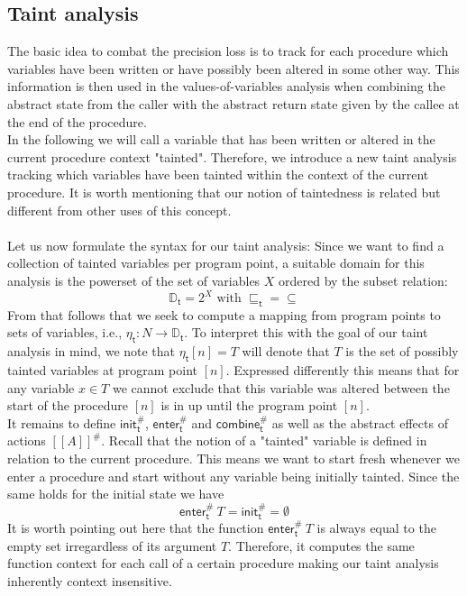    \subsection{Taint analysis}\label{section:formalTaint}
      The basic idea to combat the precision loss is to track for each procedure which variables have been written or have possibly been altered in some other way. This information is then used in the values-of-variables analysis when combining the abstract state from the caller with the abstract return state given by the callee at the end of the procedure.\\
      In the following we will call a variable that has been written or altered in the current procedure context "tainted". Therefore, we introduce a new taint analysis tracking which variables have been tainted within the context of the current procedure. It is worth mentioning that our notion of taintedness is related but different from other uses of this concept.\\
      \\
      Let us now formulate the syntax for our taint analysis:
      Since we want to find a collection of tainted variables per program point, a suitable domain for this analysis is the powerset of the set of variables $X$ ordered by the subset relation:
      \[\mathbb{D}_\textsf{t} = 2^X \text{ with } \sqsubseteq_\textsf{t} = \subseteq\]
      From that follows that we seek to compute a mapping from program points to sets of variables, i.e., $\eta_\textsf{t}: N \rightarrow \mathbb{D}_\textsf{t}$. To interpret this with the goal of our taint analysis in mind, we note that $\eta_\textsf{t} [n] = T$ will denote that $T$ is the set of possibly tainted variables at program point $[n]$. Expressed differently this means that for any variable $x \in T$ we cannot exclude that this variable was altered between the start of the procedure $[n]$ is in up until the program point $[n]$.\\
      It remains to define $\textsf{init}^{\#}_\textsf{t}$, $\textsf{enter}^{\#}_\textsf{t}$ and $\textsf{combine}^{\#}_\textsf{t}$ as well as the abstract effects of actions $[\![ A ]\!]^{\#}$. Recall that the notion of a "tainted" variable is defined in relation to the current procedure. This means we want to start fresh whenever we enter a procedure and start without any variable being initially tainted. Since the same holds for the initial state we have 
      \[\textsf{enter}^{\#}_\textsf{t}\ T = \textsf{init}^{\#}_\textsf{t} = \emptyset\]
      It is worth pointing out here that the function $\textsf{enter}^{\#}_\textsf{t}\ T$ is always equal to the empty set irregardless of its argument $T$. Therefore, it computes the same function context for each call of a certain procedure making our taint analysis inherently context insensitive.\\
